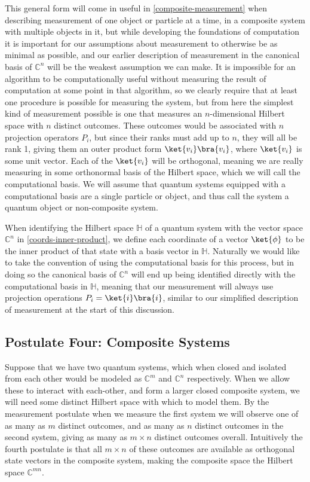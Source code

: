 This general form will come in useful in \autoref{composite-measurement} when describing measurement of one object or particle at a time, in a composite system with multiple objects in it, but while developing the foundations of computation it is important for our assumptions about measurement to otherwise be as minimal as possible, and our earlier description of measurement in the canonical basis of $\mathbb{C}^n$ will be the weakest assumption we can make. It is impossible for an algorithm to be computationally useful without measuring the result of computation at some point in that algorithm, so we clearly require that at least one procedure is possible for measuring the system, but from here the simplest kind of measurement possible is one that measures an $n$-dimensional Hilbert space with $n$ distinct outcomes. These outcomes would be associated with $n$ projection operators $P_i$, but since their ranks must add up to $n$, they will all be rank 1, giving them an outer product form $\ket{v_i}\bra{v_i}$, where $\ket{v_i}$ is some unit vector. Each of the $\ket{v_i}$ will be orthogonal, meaning we are really measuring in some orthonormal basis of the Hilbert space, which we will call the computational basis. We will assume that quantum systems equipped with a computational basis are a single particle or object, and thus call the system a quantum object or non-composite system.

When identifying the Hilbert space $\mathbb{H}$ of a quantum system with the vector space $\mathbb{C}^n$ in \autoref{coords-inner-product}, we define each coordinate of a vector $\ket{\phi}$ to be the inner product of that state with a basis vector in $\mathbb{H}$. Naturally we would like to take the convention of using the computational basis for this process, but in doing so the canonical basis of $\mathbb{C}^n$ will end up being identified directly with the computational basis in $\mathbb{H}$, meaning that our measurement will always use projection operations $P_i = \ket{i}\bra{i}$, similar to our simplified description of measurement at the start of this discussion.
\subsection{Postulate Four: Composite Systems}
Suppose that we have two quantum systems, which when closed and isolated from each other would be modeled as $\mathbb{C}^m$ and $\mathbb{C}^n$ respectively. When we allow these to interact with each-other, and form a larger closed composite system, we will need some distinct Hilbert space with which to model them. By the measurement postulate when we measure the first system we will observe one of as many as $m$ distinct outcomes, and as many as $n$ distinct outcomes in the second system, giving as many as $m \times n$ distinct outcomes overall. Intuitively the fourth postulate is that all $m \times n$ of these outcomes are available as orthogonal state vectors in the composite system, making the composite space the Hilbert space $\mathbb{C}^{mn}$.

